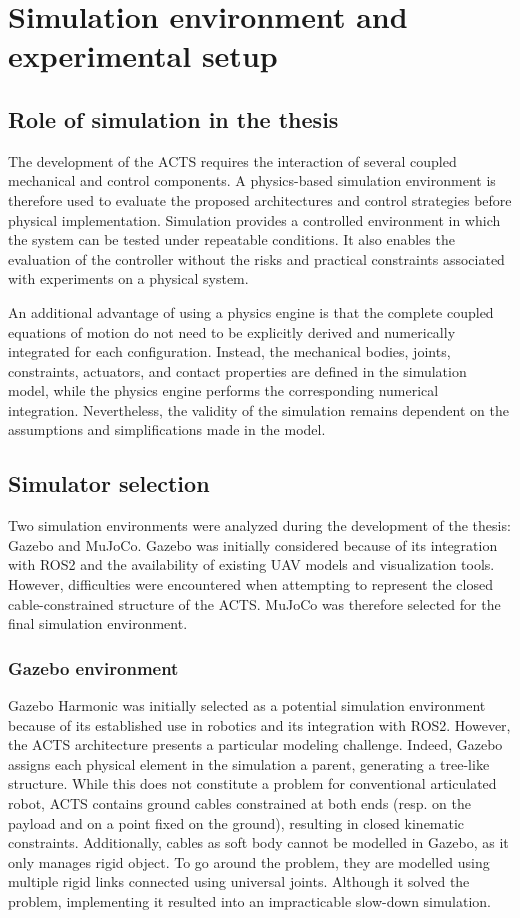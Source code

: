\chapter{Simulation environment and experimental setup}
\label{chap:simulation}
\section{Role of simulation in the thesis}
The development of the ACTS requires the interaction of several coupled mechanical and control components. A physics-based simulation environment is therefore used to evaluate the proposed architectures and control strategies before physical implementation. Simulation provides a controlled environment in which the system can be tested under repeatable conditions. It also enables the evaluation of the controller without the risks and practical constraints associated with experiments on a physical system.

An additional advantage of using a physics engine is that the complete coupled equations of motion do not need to be explicitly derived and numerically integrated for each configuration. Instead, the mechanical bodies, joints, constraints, actuators, and contact properties are defined in the simulation model, while the physics engine performs the corresponding numerical integration. Nevertheless, the validity of the simulation remains dependent on the assumptions and simplifications made in the model.

\section{Simulator selection}

Two simulation environments were analyzed during the development of the thesis: Gazebo and MuJoCo. Gazebo was initially considered because of its integration with ROS2 and the availability of existing UAV models and visualization tools. However, difficulties were encountered when attempting to represent the closed cable-constrained structure of the ACTS. MuJoCo was therefore selected for the final simulation environment.

\subsection{Gazebo environment}
Gazebo Harmonic \cite{gazebo_harmonic_getstarted} was initially selected as a potential simulation environment because of its established use in robotics and its integration with ROS2. However, the ACTS architecture presents a particular modeling challenge. Indeed, Gazebo assigns each physical element in the simulation a parent, generating a tree-like structure. While this does not constitute a problem for conventional articulated robot, ACTS contains ground cables constrained at both ends (resp. on the payload and on a point fixed on the ground), resulting in closed kinematic constraints. Additionally, cables as soft body cannot be modelled in Gazebo, as it only manages rigid object. To go around the problem, they are modelled using multiple rigid links connected using universal joints. Although it solved the problem, implementing it resulted into an impracticable slow-down simulation.

